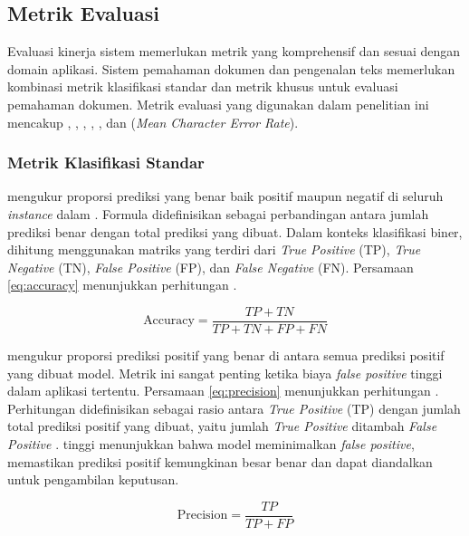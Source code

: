 \subsection{Metrik Evaluasi}
\label{subsec:metrik-evaluasi}

Evaluasi kinerja sistem \ml{} memerlukan metrik yang komprehensif dan sesuai dengan domain aplikasi. Sistem pemahaman dokumen dan pengenalan teks memerlukan kombinasi metrik klasifikasi standar dan metrik khusus untuk evaluasi pemahaman dokumen. Metrik evaluasi yang digunakan dalam penelitian ini mencakup \accuracy, \precision, \recall, \fscore, \coverage, dan \mcer{} (\emph{Mean Character Error Rate}).

\subsubsection{Metrik Klasifikasi Standar}

\accuracyfl{} mengukur proporsi prediksi yang benar baik positif maupun negatif di seluruh \emph{instance} dalam \dataset. Formula \accuracy{} didefinisikan sebagai perbandingan antara jumlah prediksi benar dengan total prediksi yang dibuat. Dalam konteks klasifikasi biner, \accuracy{} dihitung menggunakan matriks yang terdiri dari \emph{True Positive} (TP), \emph{True Negative} (TN), \emph{False Positive} (FP), dan \emph{False Negative} (FN). Persamaan \eqref{eq:accuracy} menunjukkan perhitungan \accuracy{} \parencite{jayaswal2020evalmetrics}. 

\begin{equation}
    \label{eq:accuracy}
\text{Accuracy} = \frac{TP + TN}{TP + TN + FP + FN}
\end{equation}

\precisionfl{} mengukur proporsi prediksi positif yang benar di antara semua prediksi positif yang dibuat model. Metrik ini sangat penting ketika biaya \emph{false positive} tinggi dalam aplikasi tertentu. Persamaan \eqref{eq:precision} menunjukkan perhitungan \precision. Perhitungan \precision{} didefinisikan sebagai rasio antara \emph{True Positive} (TP) dengan jumlah total prediksi positif yang dibuat, yaitu jumlah \emph{True Positive} ditambah \emph{False Positive} \parencite{jayaswal2020evalmetrics}. \precisionfl{} tinggi menunjukkan bahwa model meminimalkan \emph{false positive}, memastikan prediksi positif kemungkinan besar benar dan dapat diandalkan untuk pengambilan keputusan.

\begin{equation}
    \label{eq:precision}
\text{Precision} = \frac{TP}{TP + FP}
\end{equation}


